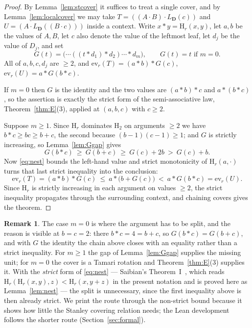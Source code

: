\documentclass[11pt,a4paper]{article}
\theoremstyle{plain}
\theoremstyle{definition}
\newtheorem{remark}[theorem]{Remark}
\newcommand{\HH}{\mathrm{H}}
\newcommand{\ev}{\mathrm{ev}}
\begin{document}
\begin{proof}
By Lemma~\ref{lem:stcover} it suffices to treat a single cover, and by
Lemma~\ref{lem:localcover} we may take
$T=((A\cdot B)\cdot L_{\mathbf D}(c))$ and $U=(A\cdot L_{\mathbf D}((B\cdot c)))$ inside
a context. Write $x*y=\HH_r(x,y)$, let $a,b$ be the values of $A,B$, let $c$ also denote
the value of the leftmost leaf, let $d_j$ be the value of $D_j$, and set
\[
  G(t)=\bigl(\cdots((t*d_1)*d_2)\cdots *d_m\bigr),\qquad G(t)=t \text{ if } m=0 .
\]
All of $a,b,c,d_j$ are $\ge2$, and $\ev_r(T)=(a*b)*G(c)$, $\ev_r(U)=a*G(b*c)$.

If $m=0$ then $G$ is the identity and the two values are $(a*b)*c$ and $a*(b*c)$, so the
assertion is exactly the strict form of the semi-associative law,
Theorem~\ref{thm:E}(3), applied at $(a,b,c)$ with $c\ge2$.

Suppose $m\ge1$. Since $\HH_r$ dominates $\HH_2$ on arguments $\ge2$ we have
$b*c\ge bc\ge b+c$, the second because $(b-1)(c-1)\ge1$; and $G$ is strictly increasing,
so Lemma~\ref{lem:Ggap} gives
\[
  G(b*c)\ \ge\ G(b+c)\ \ge\ G(c)+2b\ >\ G(c)+b .
\]
Now \eqref{eq:nest} bounds the left-hand value and strict monotonicity of
$\HH_r(a,\cdot)$ turns that last strict inequality into the conclusion:
\[
  \ev_r(T)=(a*b)*G(c)\ \le\ a*\bigl(b+G(c)\bigr)\ <\ a*G(b*c)=\ev_r(U).
\]
Since $\HH_r$ is strictly increasing in each argument on values $\ge2$, the strict
inequality propagates through the surrounding context, and chaining covers gives the
theorem.
\end{proof}

\begin{remark}\label{rem:saistrict}
The case $m=0$ is where the argument has to be split, and the reason is visible at
$b=c=2$: there $b*c=4=b+c$, so $G(b*c)=G(b+c)$, and with $G$ the identity the chain
above closes with an equality rather than a strict inequality. For $m\ge1$ the gap of
Lemma~\ref{lem:Ggap} supplies the missing unit; for $m=0$ the cover is a Tamari
rotation and Theorem~\ref{thm:E}(3) supplies it. With the \emph{strict} form of
\eqref{eq:nest} --- Saibian's Theorem~I~\cite{Sai}, which reads
$\HH_r(\HH_r(x,y),z)<\HH_r(x,y+z)$ in the present notation and is proved here as
Lemma~\ref{lem:nest} --- the split is unnecessary, since the first inequality above is
then already strict. We print the route through the non-strict bound because it shows
how little the Stanley covering relation needs; the Lean development follows the shorter
route (Section~\ref{sec:formal}).
\end{remark}
\end{document}
